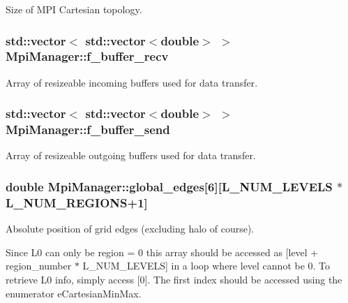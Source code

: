 Size of M\+PI Cartesian topology. 

\subsubsection[{\texorpdfstring{f\+\_\+buffer\+\_\+recv}{f_buffer_recv}}]{\setlength{\rightskip}{0pt plus 5cm}std\+::vector$<$ std\+::vector$<$double$>$ $>$ Mpi\+Manager\+::f\+\_\+buffer\+\_\+recv}\hypertarget{class_mpi_manager_ab8f1eeab50fd4812b3a51af1a6c43713}{}\label{class_mpi_manager_ab8f1eeab50fd4812b3a51af1a6c43713}


Array of resizeable incoming buffers used for data transfer. 

\subsubsection[{\texorpdfstring{f\+\_\+buffer\+\_\+send}{f_buffer_send}}]{\setlength{\rightskip}{0pt plus 5cm}std\+::vector$<$ std\+::vector$<$double$>$ $>$ Mpi\+Manager\+::f\+\_\+buffer\+\_\+send}\hypertarget{class_mpi_manager_aafbb74832f69a915927b9bf252bd971d}{}\label{class_mpi_manager_aafbb74832f69a915927b9bf252bd971d}


Array of resizeable outgoing buffers used for data transfer. 

\subsubsection[{\texorpdfstring{global\+\_\+edges}{global_edges}}]{\setlength{\rightskip}{0pt plus 5cm}double Mpi\+Manager\+::global\+\_\+edges\mbox{[}6\mbox{]}\mbox{[}{\bf L\+\_\+\+N\+U\+M\+\_\+\+L\+E\+V\+E\+LS} $\ast${\bf L\+\_\+\+N\+U\+M\+\_\+\+R\+E\+G\+I\+O\+NS}+1\mbox{]}}\hypertarget{class_mpi_manager_a26f0512e19009451431d6d0ba59bf81a}{}\label{class_mpi_manager_a26f0512e19009451431d6d0ba59bf81a}


Absolute position of grid edges (excluding halo of course). 

Since L0 can only be region = 0 this array should be accessed as \mbox{[}level + region\+\_\+number $\ast$ L\+\_\+\+N\+U\+M\+\_\+\+L\+E\+V\+E\+LS\mbox{]} in a loop where level cannot be 0. To retrieve L0 info, simply access \mbox{[}0\mbox{]}. The first index should be accessed using the enumerator e\+Cartesian\+Min\+Max. 
